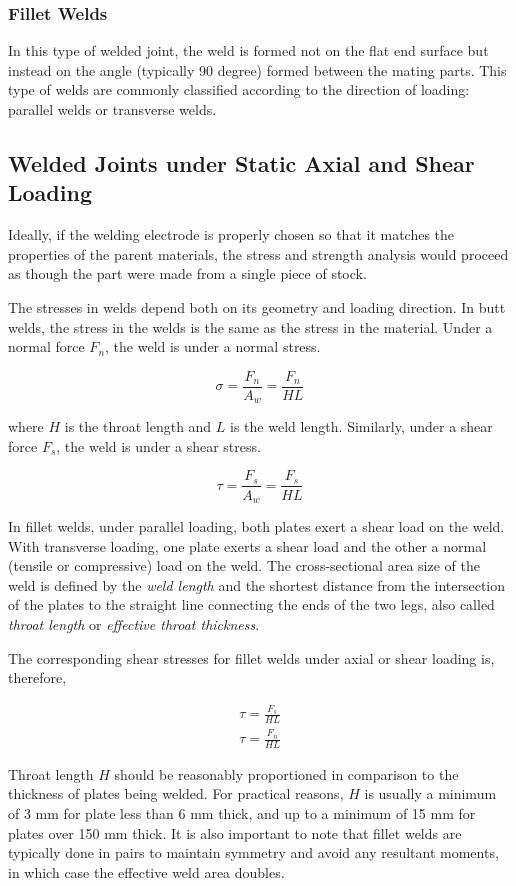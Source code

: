 \documentclass[a4paper,openany,nobib]{tufte-book}
\begin{document}
{{\subsubsection{Fillet Welds}
\label{fillet-welds}
In this type of welded joint, the weld is formed not on the flat end
surface but instead on the angle (typically 90 degree) formed between
the mating parts. This type of welds are commonly classified according
to the direction of loading: parallel welds or transverse welds.


\subsection{Welded Joints under Static Axial and Shear Loading}
\label{section: stress in weld under axial and shear}
Ideally, if the welding electrode is properly chosen so that it matches
the properties of the parent materials, the stress and strength analysis
would proceed as though the part were made from a single piece of stock.

The stresses in welds depend both on its geometry and loading direction.
In butt welds, the stress in the welds is the same as the stress in the
material. Under a normal force \(F_n\), the weld is under a normal stress.


$$\sigma  = \frac{F_n}{A_w} = \frac{F_n}{HL}$$

where \(H\) is the throat length and \(L\) is the weld length. Similarly,
under a shear force \(F_s\), the weld is under a shear stress.

$$\tau  = \frac{F_s}{A_w} = \frac{F_s}{HL}$$

In fillet welds, under parallel loading, both plates exert a shear load
on the weld. With transverse loading, one plate exerts a shear load and
the other a normal (tensile or compressive) load on the weld. The
cross-sectional area size of the weld is defined by the \emph{weld length}
and the shortest distance from the intersection of the plates to the
straight line connecting the ends of the two legs, also called \emph{throat
length} or \emph{effective throat thickness}.


The corresponding shear stresses for fillet welds under axial or shear
loading is, therefore,

$$\begin{gathered}
    \tau = \frac{F_s}{HL} \\
    \tau = \frac{F_n}{HL}
  \end{gathered}$$

Throat length \(H\) should be reasonably proportioned in comparison to the
thickness of plates being welded. For practical reasons, \(H\) is usually
a minimum of 3 mm for plate less than 6 mm thick, and up to a minimum of
15 mm for plates over 150 mm thick. It is also important to note that
fillet welds are typically done in pairs to maintain symmetry and avoid
any resultant moments, in which case the effective weld area doubles.

}}
\end{document}
